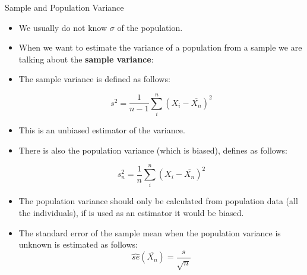 \documentclass[handout]{beamer}
\begin{document}
\begin{frame}{Sample and Population Variance}
\scriptsize{
\begin{itemize}
 \item  We usually do not know $\sigma$ of the population.
 \item When we want to estimate the variance of a population from a sample we are talking about the  \textbf{sample variance}:
\item The sample variance is defined as follows:

\begin{displaymath}
 s^{2}= \frac{1}{n-1} \sum_{i}^{n}(X_{i}-\overline{X_{n}})^2
\end{displaymath}

\item This is an unbiased estimator of the variance.

\item There is also the population variance (which is biased), defines as follows:

\begin{displaymath}
 s_{n}^{2}= \frac{1}{n} \sum_{i}^{n}(X_{i}-\overline{X_{n}})^2
\end{displaymath}

\item The population variance should only be calculated from population data (all the individuals), if is used as an estimator it would be biased.

\item The standard error of the sample mean when the population variance is unknown is estimated as follows:
\begin{displaymath}                                                                                                                 
\hat{se}(\overline{X_{n}}) = \frac{s}{\sqrt{n}}                                                                                                                \end{displaymath}


\end{itemize}


} 
\end{frame}
\end{document}
